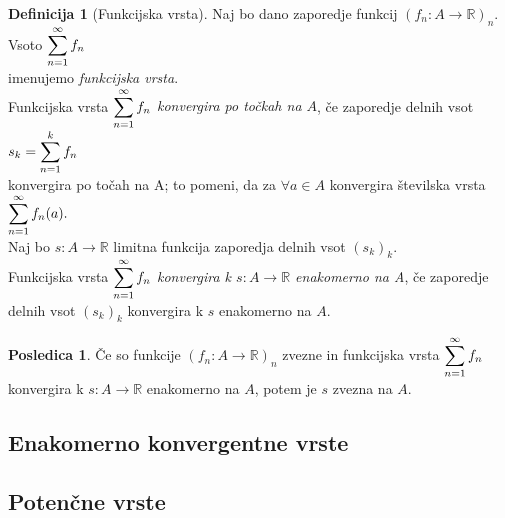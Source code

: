 \documentclass[11pt]{article}
\theoremstyle{definition}
\newtheorem{definicija}{Definicija}[section]
\theoremstyle{definition}
\theoremstyle{definition}
\theoremstyle{theorem}
\newtheorem*{posledica}{Posledica}
\begin{document}
\begin{definicija}[Funkcijska vrsta]

Naj bo dano zaporedje funkcij $(f_n: A \rightarrow \mathbb{R})_n$. Vsoto $\mathlarger{\sum_{n=1}^{\infty} f_n}$ \\ imenujemo \textit{funkcijska vrsta}. \\

Funkcijska vrsta $\mathlarger{\sum_{n=1}^{\infty} f_n}$ \textit{konvergira po točkah na $A$}, če zaporedje delnih vsot $s_k = \mathlarger{\sum_{n=1}^{k} f_n}$ \\ konvergira po točah na A; to pomeni, da za $\forall a \in A$ konvergira številska vrsta $\mathlarger{\sum_{n=1}^{\infty} f_n(a)}.$ \\

Naj bo $s: A \rightarrow \mathbb{R}$ limitna funkcija zaporedja delnih vsot $(s_k)_k$. \\
Funkcijska vrsta $\mathlarger{\sum_{n=1}^{\infty}f_n}$ \textit{konvergira k $s: A \rightarrow \mathbb{R}$ enakomerno na A}, če zaporedje delnih vsot $(s_k)_k$ konvergira k $s$ enakomerno na $A$.
 

\end{definicija}
\vspace{0.5cm}

\begin{posledica}

Če so funkcije $(f_n: A \rightarrow \mathbb{R})_n$ zvezne in funkcijska vrsta $\mathlarger{\sum_{n=1}^{\infty} f_n}$ konvergira k $s: A \rightarrow \mathbb{R}$ enakomerno na $A$, potem je $s$ zvezna na $A$.

\end{posledica}
\vspace{0.5cm}


\subsection{Enakomerno konvergentne vrste}
\vspace{0.5cm}


\subsection{Potenčne vrste}
\vspace{0.5cm}
\end{document}
